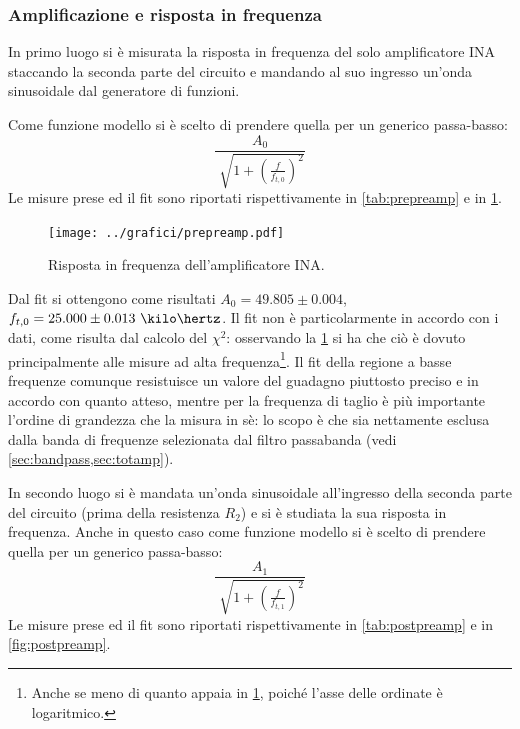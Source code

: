 \documentclass[a4paper,10pt]{article}
\begin{document}
\subsubsection*{Amplificazione e risposta in frequenza}
\vspace*{-5pt}
In primo luogo si è misurata la risposta in frequenza del solo amplificatore INA staccando la seconda parte del circuito e mandando al suo ingresso un'onda sinusoidale dal generatore di funzioni.
 
Come funzione modello si è scelto di prendere quella per un generico passa-basso:
\vspace*{-5pt}
\begin{equation}
\frac{A_0}{\sqrt[]{1+(\frac{f}{f_{t,0}})^2}}
\end{equation}
\vspace*{-5pt}
Le misure prese ed il fit sono riportati rispettivamente in \cref{tab:prepreamp} e in \cref{fig:prepreamp}.

\vspace*{-8pt}
\begin{figure}[H]
	\centering
	\texttt{[image: ../grafici/prepreamp.pdf]}
	\vspace*{-10pt}
	\caption{Risposta in frequenza dell'amplificatore INA.}
	\label{fig:prepreamp}
\end{figure}
\vspace*{-10pt}

Dal fit si ottengono come risultati $A_0 = 49.805 \pm 0.004$, $f_{t,0} = 25.000 \pm 0.013~\kilo\hertz$. Il fit non è particolarmente in accordo con i dati, come risulta dal calcolo del $ \chi^2 $: osservando la \cref{fig:prepreamp} si ha che ciò è dovuto principalmente alle misure ad alta frequenza\footnote{Anche se meno di quanto appaia in \cref{fig:prepreamp}, poiché l'asse delle ordinate è logaritmico.}.
Il fit della regione a basse frequenze comunque resistuisce un valore del guadagno piuttosto preciso e in accordo con quanto atteso, mentre per la frequenza di taglio è più importante l'ordine di grandezza che la misura in sè: lo scopo è che sia nettamente esclusa dalla banda di frequenze selezionata dal filtro passabanda (vedi \cref{sec:bandpass,sec:totamp}).

In secondo luogo si è mandata un'onda sinusoidale all'ingresso della seconda parte del circuito (prima della resistenza $R_2$) e si è studiata la sua risposta in frequenza.
Anche in questo caso come funzione modello si è scelto di prendere quella per un generico passa-basso:
\vspace*{-5pt}
\begin{equation}
\frac{A_1}{\sqrt[]{1+(\frac{f}{f_{t,1}})^2}}
\end{equation}
\vspace*{-5pt}
 Le misure prese ed il fit sono riportati rispettivamente in \cref{tab:postpreamp} e in \cref{fig:postpreamp}.
 
\end{document}
